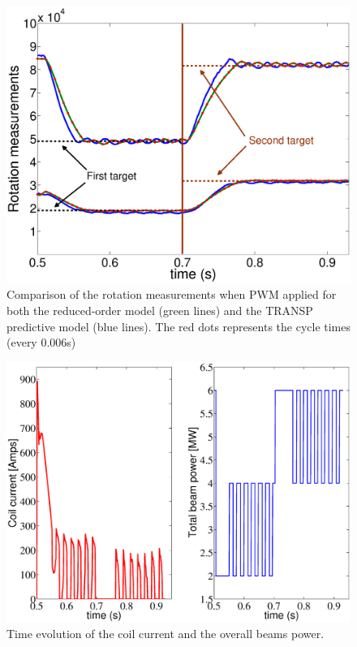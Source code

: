 \documentclass[12pt]{iopart}
\begin{document}
\begin{figure}
\centering
\includegraphics[width=\linewidth]{imene_figs/Goum16ln}
\caption{Comparison of the rotation measurements when PWM applied for both the reduced-order model (green lines) and the TRANSP predictive model (blue lines). The red dots represents the cycle times (every 0.006s)}
\label{fig:rot16}
\end{figure}

\begin{figure}
\centering
\includegraphics[width=\linewidth]{imene_figs/Goum17ln}
\caption{Time evolution of the coil current and the overall beams power.}
\label{fig:rot17}
\end{figure}
\end{document}
